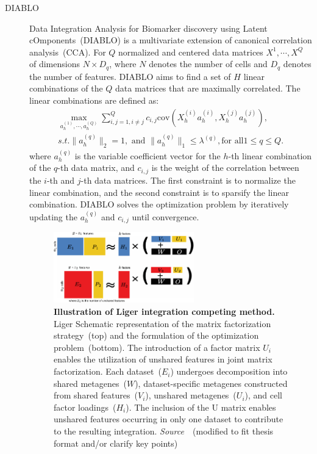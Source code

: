 \begin{description}
  \item[DIABLO]
  Data Integration Analysis for Biomarker discovery using Latent cOmponents~(DIABLO) is a multivariate extension of canonical correlation analysis~(CCA). For $Q$ normalized and centered data matrices $X^1, \cdots, X^Q$ of dimensions $N\times D_q$, where $N$ denotes the number of cells and $D_q$ denotes the number of features. DIABLO aims to find a set of $H$ linear combinations of the $Q$ data matrices that are maximally correlated. The linear combinations are defined as:
  \begin{equation}
  \begin{aligned}
  	\underset{a_h^{(1)},\cdots,a_h^{(Q)}}{\max} \sum_{i,j=1, i\neq j}^Q c_{i,j} \text{cov}(X_h^{(i)} a_h^{(i)}, X_h^{(j)} a_h^{(j)}),\\
  	s.t. \|a_h^{(q)}\|_2 = 1, \text{ and } \|a_h^{(q)}\|_1 \leq \lambda^{(q)}, \text{for all} 1\leq q \leq Q.
  \end{aligned}
  \end{equation}
  where $a_h^{(q)}$ is the variable coefficient vector for the $h$-th linear combination of the $q$-th data matrix, and $c_{i,j}$ is the weight of the correlation between the $i$-th and $j$-th data matrices. The first constraint is to normalize the linear combination, and the second constraint is to sparsify the linear combination. DIABLO solves the optimization problem by iteratively updating the $a_h^{(q)}$ and $c_{i,j}$ until convergence.


 \begin{figure}[!h]
  	\centering
  	\includegraphics[width=0.6\textwidth]{Alg_Liger/fig}
  	\vspace{0.1cm}
  	\caption[Illustration of Liger integration competing method.]{\textbf{Illustration of Liger integration competing method.} Liger Schematic representation of the matrix factorization strategy~(top) and the formulation of the optimization problem~(bottom). The introduction of a factor matrix $U_i$ enables the utilization of unshared features in joint matrix factorization. Each dataset~($E_i$) undergoes decomposition into shared metagenes~($W$), dataset-specific metagenes constructed from shared features~($V_i$), unshared metagenes~($U_i$), and cell factor loadings~($H_i$). The inclusion of the U matrix enables unshared features occurring in only one dataset to contribute to the resulting integration. \emph{Source~\cite{kriebel2022uinmf}}~(modified to fit thesis format and/or clarify key points)
  }
  	\label{fig:Alg_Liger}
 \end{figure}


\end{description}

